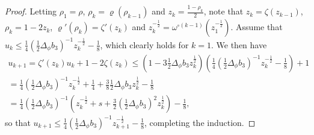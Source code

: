 \documentclass[twoside,11pt]{article}
\begin{document}
\begin{proof}
Letting $\rho_1 = \rho$, $\rho_k = \varrho(\rho_{k-1})$ and $z_k = \frac{1-\rho_k}{2}$, note that $z_k = \zeta(z_{k-1})$, $\rho_k = 1 - 2 z_k$, $\varrho'(\rho_k) = \zeta'(z_k)$ and $z_k^{-\frac{1}{2}} = \omega^{\circ (k-1)}(z_1^{-\frac{1}{2}})$. Assume that $u_k \leq \frac{1}{4} (\frac{1}{2} \Delta_\phi b_3)^{-1} z_k^{-\frac{1}{2}} - \frac{1}{8}$, which clearly holds for $k=1$. We then have
\begin{multline*}
u_{k+1} = \zeta'(z_k) u_k + 1 - 2 \zeta(z_k)
\leq \left( 1 - 3 \frac{1}{2} \Delta_\phi b_3 z_k^{\frac{1}{2}} \right) \left( \frac{1}{4} \left( \frac{1}{2} \Delta_\phi b_3 \right)^{-1} z_k^{-\frac{1}{2}} - \frac{1}{8} \right) + 1 \\
= \frac{1}{4} \left( \frac{1}{2} \Delta_\phi b_3 \right)^{-1} z_k^{-\frac{1}{2}} + \frac{1}{4} + \frac{3}{8} \frac{1}{2} \Delta_\phi b_3 z_k^{\frac{1}{2}} - \frac{1}{8} \\
= \frac{1}{4} \left( \frac{1}{2} \Delta_\phi b_3 \right)^{-1} \left( z_k^{-\frac{1}{2}} + s + \frac{3}{2} \left( \frac{1}{2} \Delta_\phi b_3 \right)^2 z_k^{\frac{1}{2}} \right) - \frac{1}{8},
\end{multline*}
so that $u_{k+1} \leq \frac{1}{4} (\frac{1}{2} \Delta_\phi b_3)^{-1} z_{k+1}^{-\frac{1}{2}} - \frac{1}{8}$, completing the induction.


\end{proof}
\end{document}
